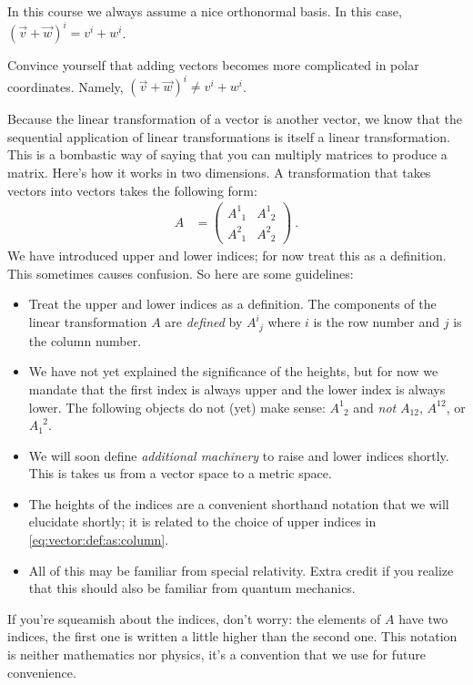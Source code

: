 In this course we always assume a nice orthonormal basis. In this case, $(\vec{v} + \vec{w})^i = v^i + w^i$.
\begin{exercise}
Convince yourself that adding vectors becomes more complicated in polar coordinates. Namely, $(\vec{v} + \vec{w})^i \neq v^i + w^i$.
\end{exercise}

Because the linear transformation of a vector is another vector, we know that the sequential application of linear transformations is itself a linear transformation. This is a bombastic way of saying that you can multiply matrices to produce a matrix.  Here’s how it works in two dimensions. A transformation that takes vectors into vectors takes the following form:
\begin{align}
  A &= 
  \begin{pmatrix}
   A^{1}_{\phantom{1}1} & A^{1}_{\phantom{1}2}
   \\
   A^{2}_{\phantom{1}1} & A^{2}_{\phantom{1}2}
  \end{pmatrix} \ .
\end{align}
We have introduced upper and lower indices; for now treat this as a definition. This sometimes causes confusion. So here are some guidelines:
\begin{itemize}
	\item Treat the upper and lower indices as a definition. The components of the linear transformation $A$ are \emph{defined} by $A^i_{\phantom{i}j}$ where $i$ is the row number and $j$ is the column number. 
	\item We have not yet explained the significance of the heights, but for now we mandate that the first index is always upper and the lower index is always lower. The following objects do not (yet) make sense: $A^{1}_{\phantom{1}2}$ and \emph{not} $A_{12}$, $A^{12}$, or $A_{1}^{\phantom{1}2}$.
	\item We will soon define \emph{additional machinery} to raise and lower indices shortly. This is takes us from a vector space to a metric space.
	\item The heights of the indices are a convenient shorthand notation that we will elucidate shortly; it is related to the choice of upper indices in \eqref{eq:vector:def:as:column}.
	\item All of this may be familiar from special relativity. Extra credit if you realize that this should also be familiar from quantum mechanics.
\end{itemize}
If you’re squeamish about the indices, don’t worry: the elements of $A$ have two indices, the first one is written a little higher than the second one. This notation is neither mathematics nor physics, it’s a convention that we use for future convenience.

